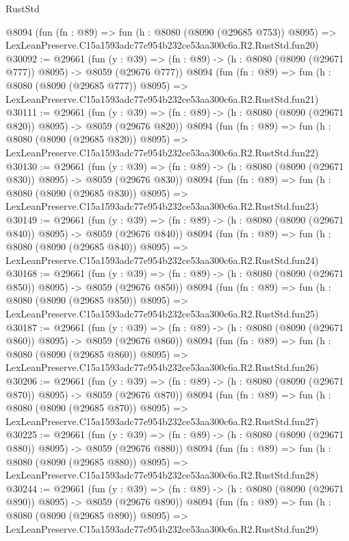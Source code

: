 \begin{lexlean}{RustStd}
\begin{coremodule}
    @8094
    (fun (fn : @89) =>
    fun (h : @8080 (@8090 (@29685 @753)) @8095) =>
    LexLeanPreserve.C15a1593adc77e954b232ce53aa300c6a.R2.RustStd.fun20)
@30092 := @29661
    (fun (y : @39) => (fn : @89) -> (h : @8080 (@8090 (@29671 @777)) @8095) -> @8059 (@29676 @777))
    @8094
    (fun (fn : @89) =>
    fun (h : @8080 (@8090 (@29685 @777)) @8095) =>
    LexLeanPreserve.C15a1593adc77e954b232ce53aa300c6a.R2.RustStd.fun21)
@30111 := @29661
    (fun (y : @39) => (fn : @89) -> (h : @8080 (@8090 (@29671 @820)) @8095) -> @8059 (@29676 @820))
    @8094
    (fun (fn : @89) =>
    fun (h : @8080 (@8090 (@29685 @820)) @8095) =>
    LexLeanPreserve.C15a1593adc77e954b232ce53aa300c6a.R2.RustStd.fun22)
@30130 := @29661
    (fun (y : @39) => (fn : @89) -> (h : @8080 (@8090 (@29671 @830)) @8095) -> @8059 (@29676 @830))
    @8094
    (fun (fn : @89) =>
    fun (h : @8080 (@8090 (@29685 @830)) @8095) =>
    LexLeanPreserve.C15a1593adc77e954b232ce53aa300c6a.R2.RustStd.fun23)
@30149 := @29661
    (fun (y : @39) => (fn : @89) -> (h : @8080 (@8090 (@29671 @840)) @8095) -> @8059 (@29676 @840))
    @8094
    (fun (fn : @89) =>
    fun (h : @8080 (@8090 (@29685 @840)) @8095) =>
    LexLeanPreserve.C15a1593adc77e954b232ce53aa300c6a.R2.RustStd.fun24)
@30168 := @29661
    (fun (y : @39) => (fn : @89) -> (h : @8080 (@8090 (@29671 @850)) @8095) -> @8059 (@29676 @850))
    @8094
    (fun (fn : @89) =>
    fun (h : @8080 (@8090 (@29685 @850)) @8095) =>
    LexLeanPreserve.C15a1593adc77e954b232ce53aa300c6a.R2.RustStd.fun25)
@30187 := @29661
    (fun (y : @39) => (fn : @89) -> (h : @8080 (@8090 (@29671 @860)) @8095) -> @8059 (@29676 @860))
    @8094
    (fun (fn : @89) =>
    fun (h : @8080 (@8090 (@29685 @860)) @8095) =>
    LexLeanPreserve.C15a1593adc77e954b232ce53aa300c6a.R2.RustStd.fun26)
@30206 := @29661
    (fun (y : @39) => (fn : @89) -> (h : @8080 (@8090 (@29671 @870)) @8095) -> @8059 (@29676 @870))
    @8094
    (fun (fn : @89) =>
    fun (h : @8080 (@8090 (@29685 @870)) @8095) =>
    LexLeanPreserve.C15a1593adc77e954b232ce53aa300c6a.R2.RustStd.fun27)
@30225 := @29661
    (fun (y : @39) => (fn : @89) -> (h : @8080 (@8090 (@29671 @880)) @8095) -> @8059 (@29676 @880))
    @8094
    (fun (fn : @89) =>
    fun (h : @8080 (@8090 (@29685 @880)) @8095) =>
    LexLeanPreserve.C15a1593adc77e954b232ce53aa300c6a.R2.RustStd.fun28)
@30244 := @29661
    (fun (y : @39) => (fn : @89) -> (h : @8080 (@8090 (@29671 @890)) @8095) -> @8059 (@29676 @890))
    @8094
    (fun (fn : @89) =>
    fun (h : @8080 (@8090 (@29685 @890)) @8095) =>
    LexLeanPreserve.C15a1593adc77e954b232ce53aa300c6a.R2.RustStd.fun29)

\end{coremodule}
\end{lexlean}
